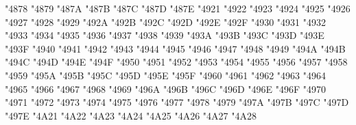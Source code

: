 {\Uchar\jis"4878 %
\Uchar\jis"4879 %
\Uchar\jis"487A %
\Uchar\jis"487B %
\Uchar\jis"487C %
\Uchar\jis"487D %
\Uchar\jis"487E %
\Uchar\jis"4921 %
\Uchar\jis"4922 %
\Uchar\jis"4923 %
\Uchar\jis"4924 %
\Uchar\jis"4925 %
\Uchar\jis"4926 %
\Uchar\jis"4927 %
\Uchar\jis"4928 %
\Uchar\jis"4929 %
\Uchar\jis"492A %
\Uchar\jis"492B %
\Uchar\jis"492C %
\Uchar\jis"492D %
\Uchar\jis"492E %
\Uchar\jis"492F %
\Uchar\jis"4930 %
\Uchar\jis"4931 %
\Uchar\jis"4932 %
\Uchar\jis"4933 %
\Uchar\jis"4934 %
\Uchar\jis"4935 %
\Uchar\jis"4936 %
\Uchar\jis"4937 %
\Uchar\jis"4938 %
\Uchar\jis"4939 %
\Uchar\jis"493A %
\Uchar\jis"493B %
\Uchar\jis"493C %
\Uchar\jis"493D %
\Uchar\jis"493E %
\Uchar\jis"493F %
\Uchar\jis"4940 %
\Uchar\jis"4941 %
\Uchar\jis"4942 %
\Uchar\jis"4943 %
\Uchar\jis"4944 %
\Uchar\jis"4945 %
\Uchar\jis"4946 %
\Uchar\jis"4947 %
\Uchar\jis"4948 %
\Uchar\jis"4949 %
\Uchar\jis"494A %
\Uchar\jis"494B %
\Uchar\jis"494C %
\Uchar\jis"494D %
\Uchar\jis"494E %
\Uchar\jis"494F %
\Uchar\jis"4950 %
\Uchar\jis"4951 %
\Uchar\jis"4952 %
\Uchar\jis"4953 %
\Uchar\jis"4954 %
\Uchar\jis"4955 %
\Uchar\jis"4956 %
\Uchar\jis"4957 %
\Uchar\jis"4958 %
\Uchar\jis"4959 %
\Uchar\jis"495A %
\Uchar\jis"495B %
\Uchar\jis"495C %
\Uchar\jis"495D %
\Uchar\jis"495E %
\Uchar\jis"495F %
\Uchar\jis"4960 %
\Uchar\jis"4961 %
\Uchar\jis"4962 %
\Uchar\jis"4963 %
\Uchar\jis"4964 %
\Uchar\jis"4965 %
\Uchar\jis"4966 %
\Uchar\jis"4967 %
\Uchar\jis"4968 %
\Uchar\jis"4969 %
\Uchar\jis"496A %
\Uchar\jis"496B %
\Uchar\jis"496C %
\Uchar\jis"496D %
\Uchar\jis"496E %
\Uchar\jis"496F %
\Uchar\jis"4970 %
\Uchar\jis"4971 %
\Uchar\jis"4972 %
\Uchar\jis"4973 %
\Uchar\jis"4974 %
\Uchar\jis"4975 %
\Uchar\jis"4976 %
\Uchar\jis"4977 %
\Uchar\jis"4978 %
\Uchar\jis"4979 %
\Uchar\jis"497A %
\Uchar\jis"497B %
\Uchar\jis"497C %
\Uchar\jis"497D %
\Uchar\jis"497E %
\Uchar\jis"4A21 %
\Uchar\jis"4A22 %
\Uchar\jis"4A23 %
\Uchar\jis"4A24 %
\Uchar\jis"4A25 %
\Uchar\jis"4A26 %
\Uchar\jis"4A27 %
\Uchar\jis"4A28 %
}
